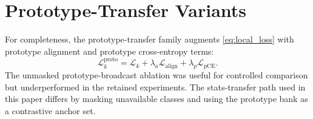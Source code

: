 \documentclass[10pt,journal]{IEEEtran}
\newcommand{\statstransfer}{stats-transfer}
\begin{document}
\appendices
\section{Prototype-Transfer Variants}
For completeness, the prototype-transfer family augments \eqref{eq:local_loss} with prototype alignment and prototype cross-entropy terms:
\begin{equation}
\mathcal{L}_k^{\mathrm{proto}} =
\mathcal{L}_k + \lambda_a\mathcal{L}_{\mathrm{align}}
+ \lambda_p\mathcal{L}_{\mathrm{pCE}}.
\end{equation}
The unmasked prototype-broadcast ablation was useful for controlled comparison but underperformed in the retained experiments. The \statstransfer{} path used in this paper differs by masking unavailable classes and using the prototype bank as a contrastive anchor set.
\end{document}
